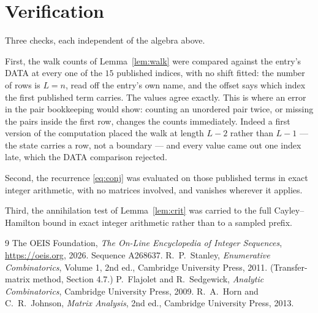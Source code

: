 \documentclass[11pt,a4paper]{article}
\theoremstyle{plain}
\theoremstyle{definition}
\begin{document}
\section{Verification}

Three checks, each independent of the algebra above.

First, the walk counts of Lemma~\ref{lem:walk} were compared against the entry's DATA at
every one of the $15$ published indices, with no shift fitted: the number of rows is
$L=n$, read off the entry's own name, and the offset says which index the first
published term carries. The values agree exactly. This is where an error in the pair
bookkeeping would show: counting an unordered pair twice, or missing the pairs inside the
first row, changes the counts immediately. Indeed a first version of the computation
placed the walk at length $L-2$ rather than $L-1$ --- the state carries a row, not a
boundary --- and every value came out one index late, which the DATA comparison rejected.

Second, the recurrence \eqref{eq:conj} was evaluated on those published terms in exact
integer arithmetic, with no matrices involved, and vanishes wherever it applies.

Third, the annihilation test of Lemma~\ref{lem:crit} was carried to the full
Cayley--Hamilton bound in exact integer arithmetic rather than to a sampled prefix.

\begin{thebibliography}{9}
 The OEIS Foundation, \emph{The On-Line Encyclopedia of Integer
Sequences}, \url{https://oeis.org}, 2026. Sequence A268637.
 R.~P.~Stanley, \emph{Enumerative Combinatorics}, Volume 1, 2nd ed.,
Cambridge University Press, 2011. (Transfer-matrix method, Section 4.7.)
 P.~Flajolet and R.~Sedgewick, \emph{Analytic Combinatorics}, Cambridge
University Press, 2009.
 R.~A.~Horn and C.~R.~Johnson, \emph{Matrix Analysis}, 2nd ed., Cambridge
University Press, 2013.
\end{thebibliography}
\end{document}
